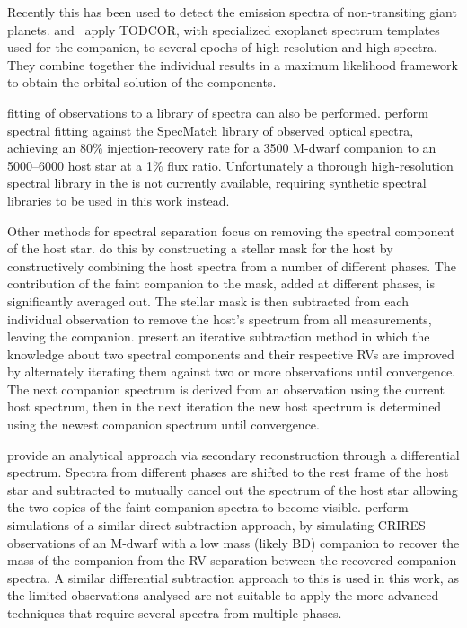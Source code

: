 Recently this has been used to detect the emission spectra of non-transiting giant planets.
\citet{lockwood_nearir_2014} and~\citet{piskorz_evidence_2016} apply TODCOR, with specialized exoplanet spectrum templates used for the companion, to several epochs of high resolution and high \snr{} \nir{} spectra.
They combine together the individual results in a maximum likelihood framework to obtain the orbital solution of the components.

\textchisquared{} fitting of observations to a library of spectra can also be performed.
\citet{kolbl_detection_2015} perform spectral fitting against the {SpecMatch} library of observed optical spectra, achieving an 80\% injection-recovery rate for a 3500\K{} {M-dwarf} companion to an 5000--6000\K{} host star at a 1\% flux ratio.
Unfortunately a thorough high-resolution spectral library in the \nir{} is not currently available, requiring synthetic spectral libraries to be used in this work instead.

Other methods for spectral separation focus on removing the spectral component of the host star.
\citet{rodler_weighing_2012} do this by constructing a stellar mask for the host by constructively combining the host spectra from a number of different phases.
The contribution of the faint companion to the mask, added at different phases, is significantly averaged out.
The stellar mask is then subtracted from each individual observation to remove the host's spectrum from all measurements, leaving the companion.
\citet{gonzalez_separation_2006} present an iterative subtraction method in which the knowledge about two spectral components and their respective {RV}s are improved by alternately iterating them against two or more observations until convergence.
The next companion spectrum is derived from an observation using the current host spectrum, then in the next iteration the new host spectrum is determined using the newest companion spectrum until convergence.

\citet{ferluga_separating_1997} provide an analytical approach via secondary reconstruction through a differential spectrum.
Spectra from different phases are shifted to the rest frame of the host star and subtracted to mutually cancel out the spectrum of the host star allowing the two copies of the faint companion spectra to become visible.
\citet{kostogryz_spectral_2013} perform simulations of a similar direct subtraction approach, by simulating CRIRES observations of an {M-dwarf} with a low mass (likely BD) companion to recover the mass of the companion from the {RV} separation between the recovered companion spectra.
A similar differential subtraction approach to this is used in this work, as the limited observations analysed are not suitable to apply the more advanced techniques that require several spectra from multiple phases.
